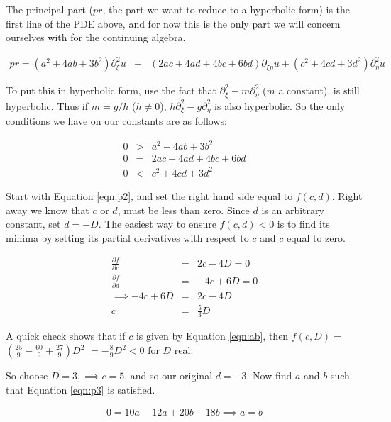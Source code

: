 \documentclass[a4paper,12pt]{article}
\begin{document}
The principal part ($pr$, the part we want to reduce to a hyperbolic form) is the first line of the PDE above, and for now this is the only part we will concern ourselves with for the continuing algebra.

\begin{eqnarray}
pr = (a^2 + 4ab + 3b^2)\partial_{\xi}^2u &+& (2ac+4ad+4bc+6bd)\partial_{\xi\eta}u + (c^2 + 4cd + 3d^2)\partial_{\eta}^2u\nonumber
\end{eqnarray}

To put this in hyperbolic form, use the fact that $\partial_{\xi}^2 - m\partial_{\eta}^2$ ($m$ a constant), is still hyperbolic. Thus if $m = g/h$ ($h\neq0$), $h\partial_{\xi}^2 - g\partial_{\eta}^2$ is also hyperbolic. So the only conditions we have on our constants are as follows: 

\begin{eqnarray}
0 &>& a^2 + 4ab + 3b^2 \label{eqn:p1}\\
0 &=& 2ac + 4ad + 4bc + 6bd \label{eqn:p3}\\
0 &<& c^2 + 4cd + 3d^2 \label{eqn:p2}
\end{eqnarray}

Start with Equation \ref{eqn:p2}, and set the right hand side equal to $f(c,d)$. Right away we know that $c$ or $d$, must be less than zero. Since $d$ is an arbitrary constant, set $d = -D$. The easiest way to ensure $f(c,d) < 0$ is to find its minima by setting its partial derivatives with respect to $c$ and $c$ equal to zero.

\begin{eqnarray}
\frac{\partial f}{\partial c} &=& 2c - 4D = 0\nonumber\\
\frac{\partial f}{\partial d} &=& -4c + 6D = 0 \nonumber\\
\implies -4c + 6D &=& 2c - 4D\nonumber\\
c &=& \frac{5}{3}D\label{eqn:ab}
\end{eqnarray}

A quick check shows that if $c$ is given by Equation \ref{eqn:ab}, then $f(c,D) = $$(\frac{25}{9} - \frac{60}{9} + \frac{27}{9})D^2$ $= -\frac{8}{9}D^2 < 0$ for $D$ real.

So choose $D = 3, \implies c = 5$, and so our original $d = -3$. Now find $a$ and $b$ such that Equation \ref{eqn:p3} is satisfied.

\begin{eqnarray}
0 =  10a - 12a + 20b - 18b\implies a = b \nonumber
\end{eqnarray}
\end{document}
